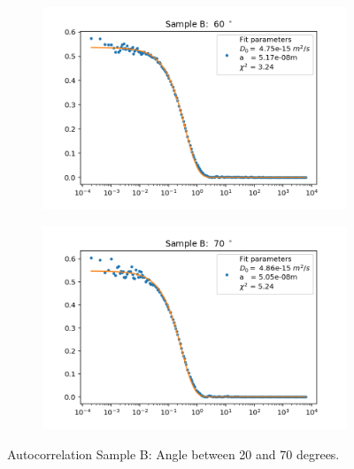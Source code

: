 \documentclass[]{article}
\begin{document}
\begin{figure}[!h]
\medskip
\begin{subfigure}{0.48\textwidth}
\includegraphics[width=\linewidth]{Plots/B/60.png}
\end{subfigure}
\begin{subfigure}[c]{0.48\linewidth}
\includegraphics[width=\linewidth]{Plots/B/70.png}
\end{subfigure}

\caption{Autocorrelation Sample B: Angle between 20 and 70 degrees.}
\end{figure}
\newpage
\end{document}
